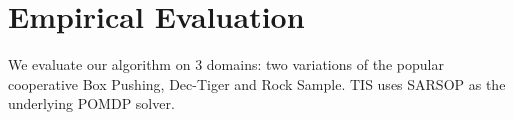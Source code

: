 \documentclass[runningheads]{llncs}
\newcommand{\citep}{\cite}
\newcommand{\commentout}[1]{}
\begin{document}
\commentout{
\begin{algorithm}
\caption{Alignment Iteration}
\begin{algorithmic}[tbph]
\State Input: PolicyGraphs $G_1, \ldots, G_M$
\For{$G_i,  i\in\{1, \ldots, M\}$}
	\State {$\mathit{NoopsReqs} \gets \mathit{VertexToIntMapping}$}
      \State {$\mathit{CurrBFS} \gets \Call{BFS}{G_i}$}
      \While {$\mathit{CurrBFS.queue}$ is not empty}
	\State {$v \gets \mathit{CurrBFS.queue.pop}$}
	\State {$a \gets v.action$}
	\If {$a$ is public action}
	\State {$\mathit{identifier} \gets \Call{GetIdentifier}{v}$}
	\State {$\mathit{MaxNoop} \gets 0$}
	\For {$G_j,  j\in\{1, \ldots, M\}\setminus\{i\}$}
	\State {$\mathit{CurrNoop} \gets \Call{NoopReq}{G_j, \mathit{identifier}}$}
	\State {$\mathit{MaxNoop} \gets max(\mathit{MaxNoop}, \mathit{CurrNoop})$}
	\EndFor
	\State {$\mathit{NoopsReqs}[v] \gets \mathit{MaxNoop} - \mathit{CompensationTerm}$}
	\EndIf
	\EndWhile
	\State {$G_i' \gets \Call{AddNoops}{G_i, \mathit{NoopsReqs}}$}
\EndFor
\State {return $G_1', \ldots, G_M'$}
\end{algorithmic}
\end{algorithm}
}

\section{Empirical Evaluation}

We evaluate our algorithm 
on 3 domains: two variations of the popular cooperative Box Pushing, Dec-Tiger and Rock Sample. TIS uses SARSOP \citep{SARSOP} as the underlying POMDP solver.
\end{document}
